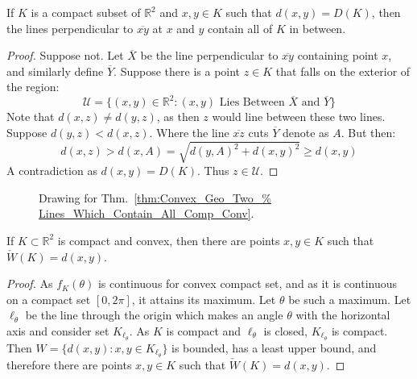 \documentclass[crop=false,class=book,oneside]{standalone}
\begin{document}
            \begin{theorem}
                \label{thm:Convex_Geo_Two_Lines_Which_Contain_All_Comp_Conv}
                If $K$ is a compact subset of $\mathbb{R}^2$ and
                $x,y\in{K}$ such that $d(x,y)=D(K)$, then the
                lines perpendicular to $\overline{xy}$ at $x$ and
                $y$ contain all of $K$ in between.
            \end{theorem}
            \begin{proof}
                Suppose not. Let $\overline{X}$ be the line perpendicular to
                $\overline{xy}$ containing point $x$, and similarly define
                $\overline{Y}$. Suppose there is a point $z\in K$ that falls
                on the exterior of the region:
                \begin{equation}
                    \mathcal{U}=\{(x,y)\in\mathbb{R}^{2}:
                        (x,y)\textrm{ Lies Between }\overline{X}
                        \textrm{ and }\overline{Y}\}
                \end{equation}
                Note that $d(x,z)\ne d(y,z)$, as then $z$ would line
                between these two lines. Suppose $d(y,z)<d(x,z)$. Where
                the line $\overline{xz}$ cuts $\overline{Y}$ denote as
                $A$. But then:
                \begin{equation}
                    d(x,z)>d(x,A)=
                    \sqrt{d(y,A)^2+d(x,y)^2}\geq
                    d(x,y)
                \end{equation}
                A contradiction as $d(x,y)=D(K)$. Thus $z\in\mathcal{U}$.
            \end{proof}
            \begin{figure}[H]
                \centering
                \captionsetup{type=figure}
                
                \caption{Drawing for Thm.~\ref{thm:Convex_Geo_Two_%
                    Lines_Which_Contain_All_Comp_Conv}.}
                \label{fig:Convex_Geo_Two_Lines_Which_Contain_All_Comp_Conv}
            \end{figure}
            \begin{theorem}
                If $K\subset \mathbb{R}^2$ is compact and convex,
                then there are points $x,y\in K$ such that
                $\check{W}(K)=d(x,y)$.
            \end{theorem}
            \begin{proof}
            As $f_K(\theta)$ is continuous for convex compact set, and as it
            is continuous on a compact set $[0,2\pi]$, it attains its maximum.
            Let $\theta$ be such a maximum. Let $\ell_{\theta}$ be the line
            through the origin which makes an angle $\theta$ with the
            horizontal axis and consider set $K_{\ell_{\theta}}$. As $K$ is
            compact and $\ell_{\theta}$ is closed, $K_{\ell_{\theta}}$ is
            compact. Then $W=\{d(x,y):x,y\in K_{\ell_{\theta}}\}$ is bounded,
            has a least upper bound, and therefore there are points
            $x,y\in K$ such that $\check{W}(K)=d(x,y)$.
            \end{proof}
\end{document}
